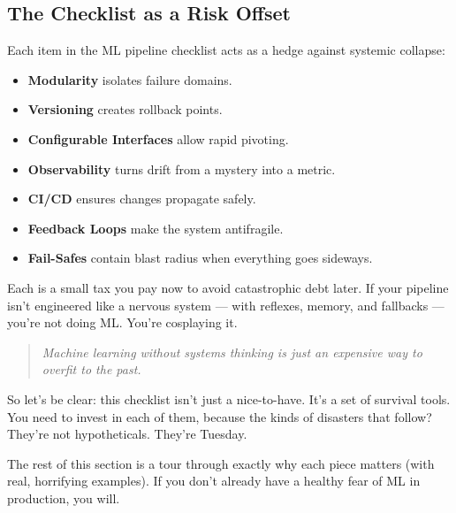 \medskip

\subsection{The Checklist as a Risk Offset}

Each item in the ML pipeline checklist acts as a hedge against systemic collapse:

\begin{itemize}
    \item \textbf{Modularity} isolates failure domains.
    \item \textbf{Versioning} creates rollback points.
    \item \textbf{Configurable Interfaces} allow rapid pivoting.
    \item \textbf{Observability} turns drift from a mystery into a metric.
    \item \textbf{CI/CD} ensures changes propagate safely.
    \item \textbf{Feedback Loops} make the system antifragile.
    \item \textbf{Fail-Safes} contain blast radius when everything goes sideways.
\end{itemize}

Each is a small tax you pay now to avoid catastrophic debt later. If your pipeline isn't engineered like a nervous system — with reflexes, memory, and fallbacks — you're not doing ML. You're cosplaying it.

\medskip

\begin{quote}
\textit{Machine learning without systems thinking is just an expensive way to overfit to the past.}
\end{quote}



So let’s be clear: this checklist isn’t just a nice-to-have. It’s a set of survival tools. You need to invest in each of them, because the kinds of disasters that follow? They’re not hypotheticals. They’re Tuesday.

The rest of this section is a tour through exactly why each piece matters (with real, horrifying examples). If you don’t already have a healthy fear of ML in production, you will.



